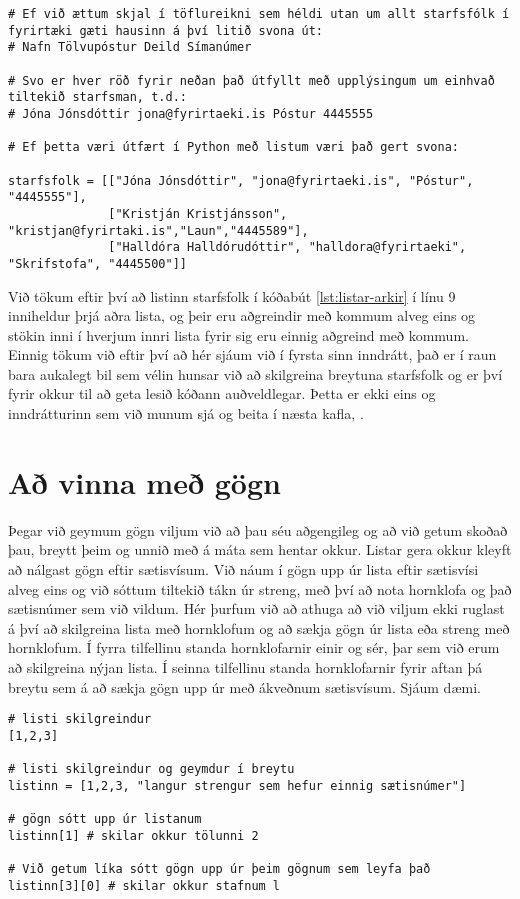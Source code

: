 \begin{lstlisting}[caption=Listar af listum, label=lst:listar-arkir]
# Ef við ættum skjal í töflureikni sem héldi utan um allt starfsfólk í fyrirtæki gæti hausinn á því litið svona út:
# Nafn Tölvupóstur Deild Símanúmer 

# Svo er hver röð fyrir neðan það útfyllt með upplýsingum um einhvað tiltekið starfsman, t.d.:
# Jóna Jónsdóttir jona@fyrirtaeki.is Póstur 4445555

# Ef þetta væri útfært í Python með listum væri það gert svona:

starfsfolk = [["Jóna Jónsdóttir", "jona@fyrirtaeki.is", "Póstur", "4445555"],
			  ["Kristján Kristjánsson", "kristjan@fyrirtaki.is","Laun","4445589"],
			  ["Halldóra Halldórudóttir", "halldora@fyrirtaeki", "Skrifstofa", "4445500"]]

\end{lstlisting}

Við tökum eftir því að listinn starfsfolk í kóðabút \ref{lst:listar-arkir} í línu 9 inniheldur þrjá aðra lista, og þeir eru aðgreindir með kommum alveg eins og stökin inni í hverjum innri lista fyrir sig eru einnig aðgreind með kommum.
Einnig tökum við eftir því að hér sjáum við í fyrsta sinn inndrátt, það er í raun bara aukalegt bil sem vélin hunsar við að skilgreina breytuna starfsfolk og er því fyrir okkur til að geta lesið kóðann auðveldlegar.
Þetta er ekki eins og inndrátturinn sem við munum sjá og beita í næsta kafla, .
 
\section{Að vinna með gögn}\label{uk:gagnavinnsla-listar}
Þegar við geymum gögn viljum við að þau séu aðgengileg og að við getum skoðað þau, breytt þeim og unnið með á máta sem hentar okkur.
Listar gera okkur kleyft að nálgast gögn eftir sætisvísum.
Við náum í gögn upp úr lista eftir sætisvísi alveg eins og við sóttum tiltekið tákn úr streng, með því að nota hornklofa og það sætisnúmer sem við vildum.
Hér þurfum við að athuga að við viljum ekki ruglast á því að skilgreina lista með hornklofum og að sækja gögn úr lista eða streng með hornklofum.
Í fyrra tilfellinu standa hornklofarnir einir og sér, þar sem við erum að skilgreina nýjan lista.
Í seinna tilfellinu standa hornklofarnir fyrir aftan þá breytu sem á að sækja gögn upp úr með ákveðnum sætisvísum.
Sjáum dæmi.

\begin{lstlisting}[caption=Listar af listum, label=lst:listar-gogn-sott]
# listi skilgreindur
[1,2,3]

# listi skilgreindur og geymdur í breytu
listinn = [1,2,3, "langur strengur sem hefur einnig sætisnúmer"]

# gögn sótt upp úr listanum
listinn[1] # skilar okkur tölunni 2

# Við getum líka sótt gögn upp úr þeim gögnum sem leyfa það
listinn[3][0] # skilar okkur stafnum l
\end{lstlisting}

